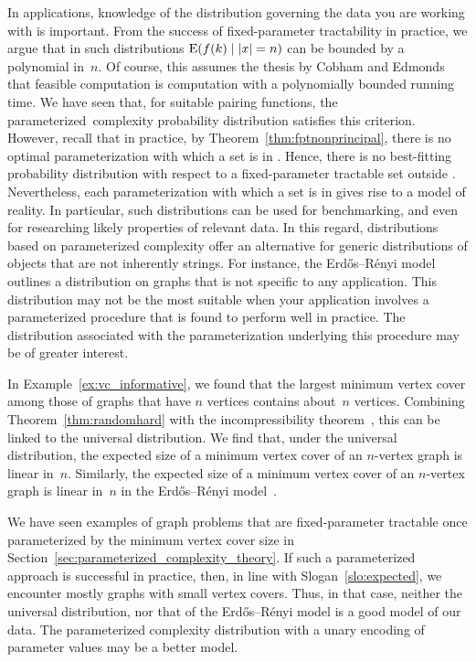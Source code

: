 In applications, knowledge of the distribution governing the data you are working with is important.
From the success of fixed-parameter tractability in practice, we argue that in such distributions $\operatorname*{E}(f(k) \mid {\lvert x\rvert} = n)$ can be bounded by a polynomial in~$n$.
Of course, this assumes the thesis by Cobham and Edmonds that feasible computation is computation with a polynomially bounded running time.
We have seen that, for suitable pairing functions, the parameterized~complexity probability distribution satisfies this criterion.
However, recall that in practice, by Theorem~\ref{thm:fptnonprincipal}, there is no optimal parameterization with which a set is in .
Hence, there is no best-fitting probability distribution with respect to a fixed-parameter tractable set outside .
Nevertheless, each parameterization with which a set is in  gives rise to a model of reality.
In particular, such distributions can be used for benchmarking, and even for researching likely properties of relevant data.
In this regard, distributions based on parameterized complexity offer an alternative for generic distributions of objects that are not inherently strings.
For instance, the Erd{\H{o}}s--R{\'e}nyi model~\parencite{erdos1959random,gilbert1959random,diestel2017graph} outlines a distribution on graphs that is not specific to any application.
This distribution may not be the most suitable when your application involves a parameterized procedure that is found to perform well in practice.
The distribution associated with the parameterization underlying this procedure may be of greater interest.
\begin{example}
\label{ex:good_model}%
  In Example~\ref{ex:vc_informative}, we found that the largest minimum vertex cover among those of graphs that have $n$ vertices contains about~$n$ vertices.
  Combining Theorem~\ref{thm:randomhard} with the incompressibility theorem~\parencite{li2008introduction}, this can be linked to the universal distribution.
  We find that, under the universal distribution, the expected size of a minimum vertex cover of an $n$-vertex graph is linear in~$n$.
  Similarly, the expected size of a minimum vertex cover of an $n$-vertex graph is linear in~$n$ in the Erd{\H{o}}s--R{\'e}nyi model~\parencite[Theorem~23]{witteveen2015structural}.

  We have seen examples of graph problems that are fixed-parameter tractable once parameterized by the minimum vertex cover size in Section~\ref{sec:parameterized_complexity_theory}.
  If such a parameterized approach is successful in practice, then, in line with Slogan~\ref{slo:expected}, we encounter mostly graphs with small vertex covers.
  Thus, in that case, neither the universal distribution, nor that of the Erd{\H{o}}s--R{\'e}nyi model is a good model of our data.
  The parameterized complexity distribution with a unary encoding of parameter values may be a better model.
\end{example}

